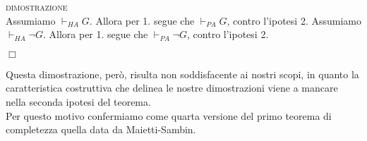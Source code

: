 	\textsc{dimostrazione}\\
 	Assumiamo $\vdash_{HA}G$. Allora per 1. segue che $\vdash_{PA} G$, contro l'ipotesi 2.
	Assumiamo $\vdash_{HA}\neg G$. Allora per 1. segue che $\vdash_{PA} \neg G$, contro l'ipotesi 2.
	\begin{flushright}$\Box$\end{flushright}
	Questa dimostrazione, per\`{o}, risulta non soddisfacente ai nostri scopi, in quanto la caratteristica costruttiva che delinea le nostre dimostrazioni viene a mancare nella seconda ipotesi del teorema. \\
	Per questo motivo confermiamo come quarta versione del primo teorema di completezza quella data da Maietti-Sambin.

